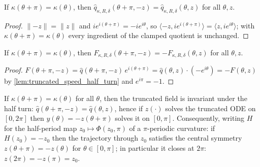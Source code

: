 \begin{lemma}
  \label{lem:truncated_speed_half_turn}
  If $\kappa(\theta+\pi)=\kappa(\theta)$, then
  $\hat q_{\kappa,R,\delta}(\theta+\pi,-z)=\hat q_{\kappa,R,\delta}(\theta,z)$ for all
  $\theta,z$.
\end{lemma}

\begin{proof}

\leanok
  $\|{-z}\|=\|z\|$ and $ie^{i(\theta+\pi)}=-ie^{i\theta}$, so
  $\langle -z,ie^{i(\theta+\pi)}\rangle=\langle z,ie^{i\theta}\rangle$; with
  $\kappa(\theta+\pi)=\kappa(\theta)$ every ingredient of the clamped quotient is
  unchanged.
\end{proof}

\begin{lemma}
  \label{lem:truncated_field_half_turn}
  If $\kappa(\theta+\pi)=\kappa(\theta)$, then
  $F_{\kappa,R,\delta}(\theta+\pi,-z)=-F_{\kappa,R,\delta}(\theta,z)$ for all
  $\theta,z$.
\end{lemma}

\begin{proof}

\leanok
  $F(\theta+\pi,-z)=\hat q(\theta+\pi,-z)\,e^{i(\theta+\pi)}
   =\hat q(\theta,z)\cdot(-e^{i\theta})=-F(\theta,z)$ by
  \cref{lem:truncated_speed_half_turn} and $e^{i\pi}=-1$.
\end{proof}

\begin{lemma}

  \label{lem:flow_half_turn_equivariance}
  If $\kappa(\theta+\pi)=\kappa(\theta)$ for all $\theta$, then the truncated field is
  invariant under the half turn: $\hat q(\theta+\pi,-z)=\hat q(\theta,z)$, hence if
  $z(\cdot)$ solves the truncated ODE on $[0,2\pi]$ then $y(\theta)=-z(\theta+\pi)$
  solves it on $[0,\pi]$. Consequently, writing $H$ for the half-period map
  $z_0\mapsto\Phi(z_0,\pi)$ of a $\pi$-periodic curvature: if $H(z_0)=-z_0$ then the
  trajectory through $z_0$ satisfies the central symmetry $z(\theta+\pi)=-z(\theta)$ for
  $\theta\in[0,\pi]$; in particular it closes at $2\pi$: $z(2\pi)=-z(\pi)=z_0$.
\end{lemma}

